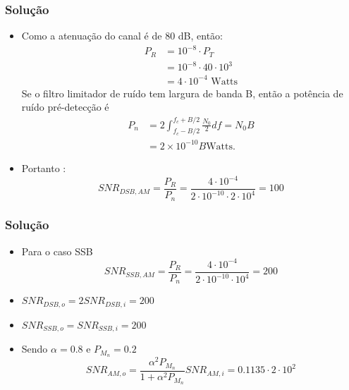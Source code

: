 \documentclass{beamer}
\begin{document}
\begin{frame}
  \frametitle{Solução}

  \begin{itemize}
    \item  Como a atenuação do canal é de 80 dB, então: 
    \begin{align*}
      P_R &= 10^{-8} \cdot P_T \\
        &= 10^{-8} \cdot 40 \cdot 10^3 \\
        & = 4 \cdot 10^{-4} \text{ Watts}
      \end{align*}
      Se o filtro limitador de ruído tem largura de banda B, então a potência de ruído pré-detecção é
      \begin{align*}
        P_n &= 2 \int_{f_c - B/2}^{f_c + B/2} \frac{N_0}{2}df = N_0B  \\
        & = 2 \times 10^{-10} B \text{Watts}.
      \end{align*}
    \item Portanto  : 
      \begin{equation*}
        SNR_{DSB,AM} = \frac{P_R}{P_n} = \frac{4\cdot 10^{-4}}{2 \cdot 10^{-10} \cdot 2 \cdot 10^4} = 100
        \end{equation*}
  \end{itemize}

\end{frame}

\begin{frame}
  \frametitle{Solução}
  \begin{itemize} 
    \item Para o caso SSB
  \begin{equation*}
    SNR_{SSB,AM} = \frac{P_R}{P_n} = \frac{4\cdot 10^{-4}}{2 \cdot 10^{-10} \cdot 10^4} = 200
    \end{equation*}
  
    \item $SNR_{DSB,o} = 2 SNR_{DSB,i} = 200 $
    \item $SNR_{SSB,o} = SNR_{SSB,i} = 200 $
    \item Sendo $\alpha = 0.8$ e $P_{M_n} = 0.2$ 
    \begin{equation}
      SNR_{AM,o} = \frac{\alpha^2 P_{M_n}}{1 + \alpha^2 P_{M_n}}SNR_{AM,i} = 0.1135 \cdot 2 \cdot 10^2
      \end{equation}
  \end{itemize}  

\end{frame}
\end{document}
